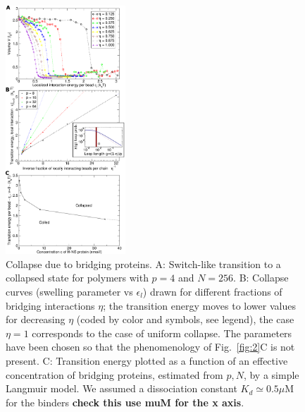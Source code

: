 \documentclass[a4paper,12pt,pre,superscriptaddress]{revtex4}
\begin{document}
\begin{figure}
  \centering
  \includegraphics[width=0.4\textwidth]{fig3}
  \caption{Collapse due to bridging proteins.  A: Switch-like
    transition to a collapsed state for polymers with $p=4$ and $N=256$.
%
B: Collapse curves (swelling parameter vs
    $\epsilon_l$) drawn for different fractions of bridging
    interactions $\eta$; the transition energy moves to lower values
    for decreasing $\eta$ (coded by color and symbols, see legend),
    the case $\eta=1$ corresponds to the case of uniform collapse. The
    parameters have been chosen so that the phenomenology of
    Fig.~\ref{fig:2}C is not present. 
C:  Transition energy plotted as a function of an effective
concentration  of bridging proteins, estimated  from $p,N$, by a
simple 
Langmuir model. We assumed a dissociation constant $K_d\simeq 0.5
\mu$M 
for the binders \textbf{check this use muM for the x axis}.      
%
}
  \label{fig:3}
\end{figure}

%
\end{document}
